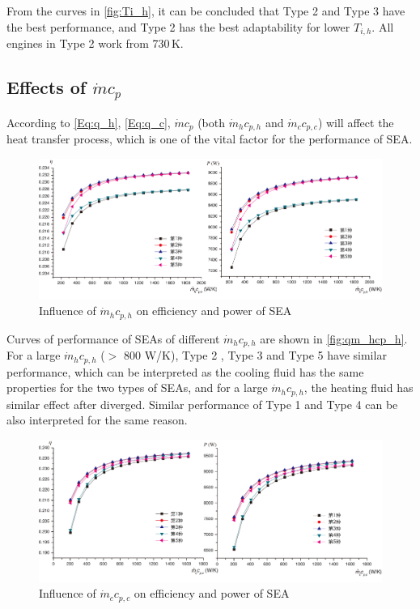 From the curves in \autoref{fig:Ti_h}, it can be concluded that Type 2 and Type 3 have the best performance, and Type 2 has the best adaptability for lower $T_{i,h}$. All engines in Type 2 work from 730\,K.

\subsection{Effects of $\dot{m}c_p$}

According to \autoref{Eq:q_h}, \autoref{Eq:q_c}, $\dot{m}c_p$ (both $\dot{m}_hc_{p,h}$ and $\dot{m}_cc_{p,c}$) will affect the heat transfer process, which is one of the vital factor for the performance of SEA.


\begin{figure}[htbp]
\centering
	\includegraphics[width = 0.7\columnwidth]{fig/qm_hcp_h}
	\caption{Influence of $\dot{m}_hc_{p,h}$ on efficiency and power of SEA}
	\label{fig:qm_hcp_h}
\end{figure}

Curves of performance of SEAs of different $\dot{m}_hc_{p,h}$ are shown in \autoref{fig:qm_hcp_h}.
For a large $\dot{m}_hc_{p,h}$ ($>$ 800 W/K), Type 2 , Type 3 and Type 5 have similar performance, which can be interpreted as the cooling fluid has the same properties for the two types of SEAs, and for a large $\dot{m}_hc_{p,h}$, the heating fluid has similar effect after diverged. Similar performance of Type 1 and Type 4 can be also interpreted for the same reason.

\begin{figure}[htbp]
\centering
	\includegraphics[width = 0.7\columnwidth]{fig/qm_ccp_c}
	\caption{Influence of $\dot{m}_cc_{p,c}$ on efficiency and power of SEA}
	\label{fig:qm_ccp_c}
\end{figure}

